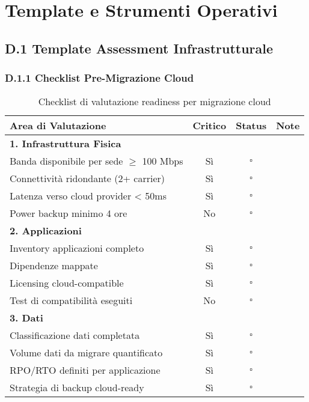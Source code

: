 
\chapter{Template e Strumenti Operativi}
\label{app:template}

\section{D.1 Template Assessment Infrastrutturale}

\subsection{D.1.1 Checklist Pre-Migrazione Cloud}

\begin{table}[htbp]
\centering
\caption{Checklist di valutazione readiness per migrazione cloud}
\begin{tabular}{|p{6cm}|c|c|p{4cm}|}
\hline
\textbf{Area di Valutazione} & \textbf{Critico} & \textbf{Status} & \textbf{Note} \\
\hline
\multicolumn{4}{|l|}{\textbf{1. Infrastruttura Fisica}} \\
\hline
Banda disponibile per sede $\geq$ 100 Mbps & Sì & $\square$ & \\
\hline
Connettività ridondante (2+ carrier) & Sì & $\square$ & \\
\hline
Latenza verso cloud provider < 50ms & Sì & $\square$ & \\
\hline
Power backup minimo 4 ore & No & $\square$ & \\
\hline
\multicolumn{4}{|l|}{\textbf{2. Applicazioni}} \\
\hline
Inventory applicazioni completo & Sì & $\square$ & \\
\hline
Dipendenze mappate & Sì & $\square$ & \\
\hline
Licensing cloud-compatible & Sì & $\square$ & \\
\hline
Test di compatibilità eseguiti & No & $\square$ & \\
\hline
\multicolumn{4}{|l|}{\textbf{3. Dati}} \\
\hline
Classificazione dati completata & Sì & $\square$ & \\
\hline
Volume dati da migrare quantificato & Sì & $\square$ & \\
\hline
RPO/RTO definiti per applicazione & Sì & $\square$ & \\
\hline
Strategia di backup cloud-ready & Sì & $\square$ & \\

\end{tabular}
\end{table}

